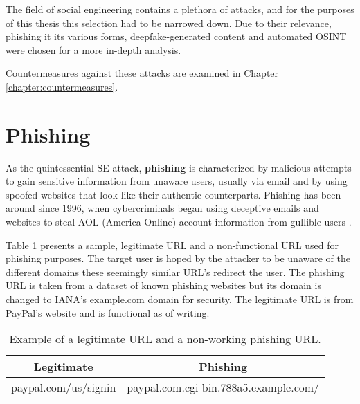 The field of social engineering contains a plethora of attacks, and for the purposes of this thesis this selection had to be narrowed down. Due to their relevance, phishing it its various forms, deepfake-generated content and automated OSINT were chosen for a more in-depth analysis.

Countermeasures against these attacks are examined in Chapter \ref{chapter:countermeasures}.










\section{Phishing}
\begin{comment}
    
    - 

\end{comment}


As the quintessential SE attack, \textbf{phishing} is characterized by malicious attempts to gain sensitive information from unaware users, usually via email and by using spoofed websites that look like their authentic counterparts. Phishing has been around since 1996, when cybercriminals began using deceptive emails and websites to steal AOL (America Online) account information from gullible users \citep{wangDefiningSocialEngineering2020}.

Table \ref{tab:placeholder_label} presents a sample, legitimate URL and a non-functional URL used for phishing purposes. The target user is hoped by the attacker to be unaware of the different domains these seemingly similar URL's redirect the user. The phishing URL is taken from a dataset of known phishing websites but its domain is changed to IANA's example.com domain for security. The legitimate URL is from PayPal's website and is functional as of writing.

\begin{table}[h]
    \centering
    \begin{tabular}{|c|c|}
        \hline
        Legitimate & Phishing \\ \hline
        paypal.com/us/signin &paypal.com.cgi-bin.788a5.example.com/ \\ \hline
    \end{tabular}
    \caption{Example of a legitimate URL and a non-working phishing URL.}
    \label{tab:placeholder_label}
\end{table}

